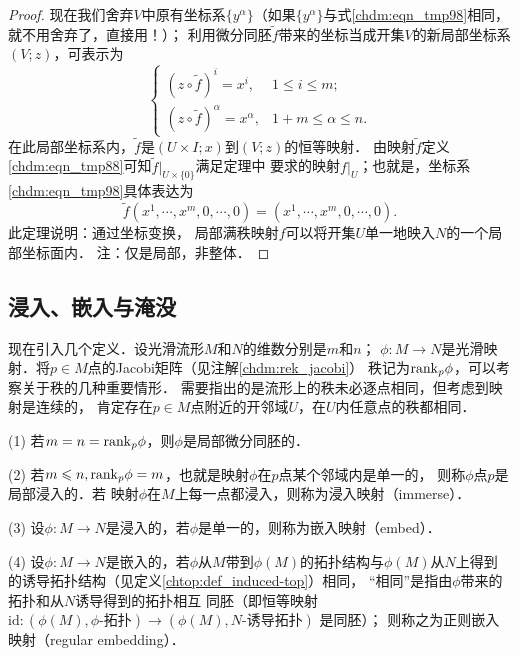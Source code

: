\begin{proof}
    现在我们舍弃$V$中原有坐标系$\{y^\alpha\}$（如果$\{y^\alpha\}$与式\eqref{chdm:eqn_tmp98}相同，
    就不用舍弃了，直接用！）；
    利用微分同胚$\tilde{f}$带来的坐标当成开集$V$的新局部坐标系$(V;z)$，可表示为
    \begin{equation}\label{chdm:eqn_tmp98}
    \begin{cases}
        (z\circ \tilde{f})^i = x^i, & 1 \leqslant i \leqslant m; \\
        (z\circ \tilde{f})^\alpha =x^\alpha, & 1+m \leqslant \alpha \leqslant n .
    \end{cases}
    \end{equation}
    在此局部坐标系内，$\tilde{f}$是$(U\times I;x)$到$(V;z)$的恒等映射．
    由映射$\tilde{f}$定义\eqref{chdm:eqn_tmp88}可知$\tilde{f}|_{U\times\{0\}}$满足定理中
    要求的映射$f|_U$；也就是，坐标系\eqref{chdm:eqn_tmp98}具体表达为
    \begin{equation}
        \tilde{f}(x^1,\cdots,x^m,0,\cdots,0)
        = (x^1,\cdots,x^m,0,\cdots,0).
    \end{equation}
    此定理说明：通过坐标变换，
    局部满秩映射$f$可以将开集$U$单一地映入$N$的一个局部坐标面内．
    注：仅是局部，非整体．
\end{proof}


\subsection{浸入、嵌入与淹没}\label{chdm:sec_immerse-embed}
现在引入几个定义．设光滑流形$M$和$N$的维数分别是$m$和$n$；
$\phi:M\to N$是光滑映射．将$p\in M$点的Jacobi矩阵（见注解\ref{chdm:rek_jacobi}）
秩记为${\rm rank}_p \phi$，可以考察关于秩的几种重要情形．
需要指出的是流形上的秩未必逐点相同，但考虑到映射是连续的，
肯定存在$p\in M$点附近的开邻域$U$，在$U$内任意点的秩都相同．

(1) 若$m=n={\rm rank}_p\phi$，则$\phi$是局部微分同胚的．

(2) 若$m\leqslant n, {\rm rank}_p\phi=m$，也就是映射$\phi$在$p$点某个邻域内是单一的，
则称$\phi$点$p$是{\heiti 局部浸入}的．若
映射$\phi$在$M$上每一点都浸入，则称为{\heiti 浸入映射}（immerse）．

(3) 设$\phi:M\to N$是浸入的，若$\phi$是单一的，则称为{\heiti 嵌入映射}（embed）．

(4) 设$\phi:M\to N$是嵌入的，若$\phi$从$M$带到$\phi(M)$的拓扑结构与$\phi(M)$从$N$上得到
的诱导拓扑结构（见定义\ref{chtop:def_induced-top}）相同，
“相同”是指由$\phi$带来的拓扑和从$N$诱导得到的拓扑相互
同胚（即恒等映射 $\mathrm{id}:(\phi(M),\phi\text{-拓扑})\to(\phi(M),N\text{-诱导拓扑})$ 是同胚）；
则称之为{\heiti 正则嵌入映射}（regular embedding）．

